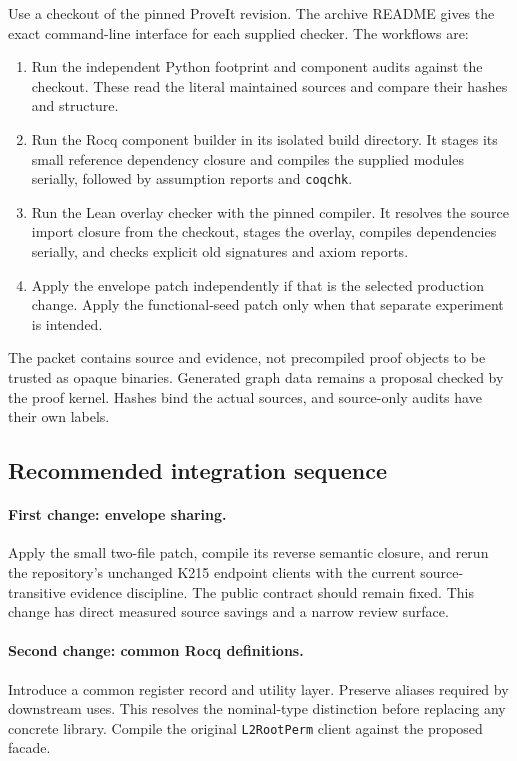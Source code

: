 \documentclass[11pt,letterpaper]{article}
\theoremstyle{definition}\newtheorem{definition}[theorem]{Definition}
\theoremstyle{remark}\newtheorem{remark}[theorem]{Remark}
\newcommand{\code}[1]{\texttt{\small #1}}
\begin{document}
Use a checkout of the pinned ProveIt revision. The archive README gives the exact command-line interface for each supplied checker. The workflows are:
\begin{enumerate}
\item Run the independent Python footprint and component audits against the checkout. These read the literal maintained sources and compare their hashes and structure.
\item Run the Rocq component builder in its isolated build directory. It stages its small reference dependency closure and compiles the supplied modules serially, followed by assumption reports and \code{coqchk}.
\item Run the Lean overlay checker with the pinned compiler. It resolves the source import closure from the checkout, stages the overlay, compiles dependencies serially, and checks explicit old signatures and axiom reports.
\item Apply the envelope patch independently if that is the selected production change. Apply the functional-seed patch only when that separate experiment is intended.
\end{enumerate}

The packet contains source and evidence, not precompiled proof objects to be trusted as opaque binaries. Generated graph data remains a proposal checked by the proof kernel. Hashes bind the actual sources, and source-only audits have their own labels.

\subsection{Recommended integration sequence}

\paragraph{First change: envelope sharing.}
Apply the small two-file patch, compile its reverse semantic closure, and rerun the repository's unchanged K215 endpoint clients with the current source-transitive evidence discipline. The public contract should remain fixed. This change has direct measured source savings and a narrow review surface.

\paragraph{Second change: common Rocq definitions.}
Introduce a common register record and utility layer. Preserve aliases required by downstream uses. This resolves the nominal-type distinction before replacing any concrete library. Compile the original \code{L2RootPerm} client against the proposed facade.
\end{document}
